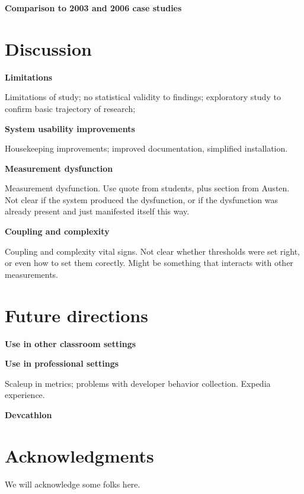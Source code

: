 \documentclass{acm_proc_article-sp}
\begin{document}
{\bf Comparison to 2003 and 2006 case studies}


\section{Discussion}

{\bf Limitations}

Limitations of study; no statistical validity to findings; exploratory study to confirm basic trajectory of research;

{\bf System usability improvements}

Housekeeping improvements; improved documentation, simplified installation.

{\bf Measurement dysfunction}

Measurement dysfunction.  Use quote from students, plus section from Austen.  Not clear if the system produced the
dysfunction, or if the dysfunction was already present and just manifested itself this way. 

{\bf Coupling and complexity}

Coupling and complexity vital signs.  Not clear whether thresholds were set right, or even how to set them corectly.  Might be something that interacts with other measurements. 


\section{Future directions}
\label{sec:conclusions}

{\bf Use in other classroom settings}

{\bf Use in professional settings}

Scaleup in metrics; problems with developer behavior collection. Expedia experience. 

{\bf Devcathlon}


\section{Acknowledgments}

We will acknowledge some folks here.


  
\end{document}
